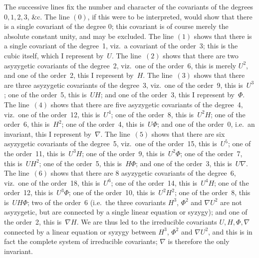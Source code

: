 \documentclass[11pt]{article}
\begin{document}
The successive lines fix the number and character of the covariants of the degrees $0, 1, 2, 3$, \&c. The line $(0)$, if this were to be interpreted, would show that there is a single covariant of the degree $0$; this covariant is of course merely the absolute constant unity, and may be excluded. The line $(1)$ shows that there is a single covariant of the degree~1, viz.\ a covariant of the order~3; this is the cubic itself, which I represent by~$U$. The line~$(2)$ shows that there are two asyzygetic covariants of the degree~2, viz.\ one of the order~6, this is merely $U^2$, and one of the order~2, this I represent by~$H$. The line~$(3)$ shows that there are three asyzygetic covariants of the degree~3, viz.\ one of the order~9, this is~$U^3$; one of the order~5, this is~$UH$; and one of the order~3, this I represent by~$\Phi$. The line~$(4)$ shows that there are five asyzygetic covariants of the degree~4, viz.\ one of the order~12, this is~$U^4$; one of the order~8, this is~$U^2 H$; one of the order~6, this is~$H^2$; one of the order~4, this is~$U\Phi$; and one of the order~0, i.e.\ an invariant, this I represent by~$\nabla$. The line~$(5)$ shows that there are six asyzygetic covariants of the degree~5, viz.\ one of the order~15, this is~$U^5$; one of the order~11, this is~$U^3 H$; one of the order~9, this is~$U^2 \Phi$; one of the order~7, this is~$UH^2$; one of the order~5, this is~$H\Phi$; and one of the order~3, this is~$U\nabla$. The line~$(6)$ shows that there are 8 asyzygetic covariants of the degree~6, viz.\ one of the order~18, this is~$U^6$; one of the order~14, this is~$U^4 H$; one of the order~12, this is~$U^3\Phi$; one of the order~10, this is~$U^2 H^2$; one of the order~8, this is~$U H\Phi$; two of the order~6 (i.e.\ the three covariants $H^3$, $\Phi^2$ and $\nabla U^2$ are not asyzygetic, but are connected by a single linear equation or syzygy); and one of the order~2, this is~$\nabla H$. We are thus led to the irreducible covariants $U, H, \Phi, \nabla$ connected by a linear equation or syzygy between $H^3$, $\Phi^2$ and $\nabla U^2$, and this is in fact the complete system of irreducible covariants; $\nabla$ is therefore the only invariant.
\end{document}
